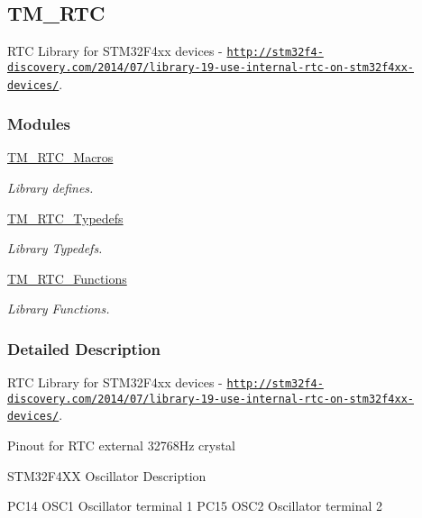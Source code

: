 \hypertarget{group___t_m___r_t_c}{}\subsection{T\+M\+\_\+\+R\+T\+C}
\label{group___t_m___r_t_c}


R\+T\+C Library for S\+T\+M32\+F4xx devices -\/ \href{http://stm32f4-discovery.com/2014/07/library-19-use-internal-rtc-on-stm32f4xx-devices/}{\tt http\+://stm32f4-\/discovery.\+com/2014/07/library-\/19-\/use-\/internal-\/rtc-\/on-\/stm32f4xx-\/devices/}.  


\subsubsection*{Modules}
\begin{DoxyCompactItemize}
\item 
\hyperlink{group___t_m___r_t_c___macros}{T\+M\+\_\+\+R\+T\+C\+\_\+\+Macros}
\begin{DoxyCompactList}\small\item\em Library defines. \end{DoxyCompactList}\item 
\hyperlink{group___t_m___r_t_c___typedefs}{T\+M\+\_\+\+R\+T\+C\+\_\+\+Typedefs}
\begin{DoxyCompactList}\small\item\em Library Typedefs. \end{DoxyCompactList}\item 
\hyperlink{group___t_m___r_t_c___functions}{T\+M\+\_\+\+R\+T\+C\+\_\+\+Functions}
\begin{DoxyCompactList}\small\item\em Library Functions. \end{DoxyCompactList}\end{DoxyCompactItemize}


\subsubsection{Detailed Description}
R\+T\+C Library for S\+T\+M32\+F4xx devices -\/ \href{http://stm32f4-discovery.com/2014/07/library-19-use-internal-rtc-on-stm32f4xx-devices/}{\tt http\+://stm32f4-\/discovery.\+com/2014/07/library-\/19-\/use-\/internal-\/rtc-\/on-\/stm32f4xx-\/devices/}. 

\begin{DoxyParagraph}{Pinout for R\+T\+C external 32768\+Hz crystal}

\end{DoxyParagraph}
\begin{DoxyVerb} STM32F4XX  Oscillator   Description
    
 PC14       OSC1         Oscillator terminal 1
 PC15       OSC2         Oscillator terminal 2
\end{DoxyVerb}



